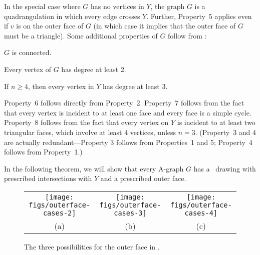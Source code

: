 In the special case where $G$ has no vertices in $Y$, the graph $G$ is a quadrangulation in which every edge crosses $Y$. Further, Property~5 applies even if $v$ is on the outer face of $G$ (in which case it implies that the outer face of $G$ must be a triangle).
Some additional properties of $G$ follow from :
\begin{compactenum}\setcounter{enumi}{5}
	\item $G$ is connected.
	\item Every vertex of $G$ has degree at least 2.   
	\item If $n\ge 4$, then every vertex in $Y$ has degree at least 3. 
\end{compactenum}
Property~6 follows directly from Property~2.
Property~7 follows from the fact that every vertex is incident to at
least one face and every face is a simple cycle.
Property~8 follows from the fact that every vertex on $Y$ is incident
to at least two triangular faces, which involve at least 4 vertices,
unless $n=3$.
(Property~3 and 4 are actually redundant---Property 3 follows from Properties~1 and 5; Property~4 follows from Property~1.)

%
%

In the following theorem,
we will show that every A-graph $G$ has a \Fary\ drawing with prescribed intersections with $Y$ and a prescribed outer face.

\begin{figure}
   \begin{center}\begin{tabular}{ccc}
      \texttt{[image: figs/outerface-cases-2]} & 
      \texttt{[image: figs/outerface-cases-3]} & 
      \texttt{[image: figs/outerface-cases-4]} \\
      (a) & (b) & (c)
   \end{tabular}\end{center}
   \caption{The three possibilities for the outer face in
     .
   }
\end{figure} 

